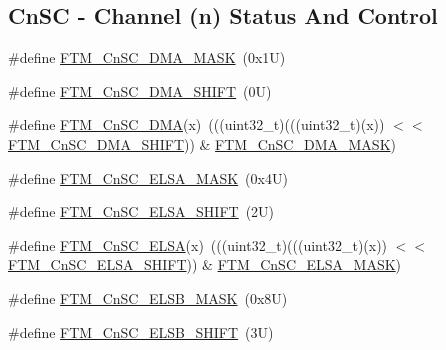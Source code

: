 \subsection*{Cn\+SC -\/ Channel (n) Status And Control}
\begin{DoxyCompactItemize}
\item 
\#define \mbox{\hyperlink{group___f_t_m___register___masks_gab38e53cd8f53bb325b849510374280f8}{F\+T\+M\+\_\+\+Cn\+S\+C\+\_\+\+D\+M\+A\+\_\+\+M\+A\+SK}}~(0x1\+U)
\item 
\#define \mbox{\hyperlink{group___f_t_m___register___masks_ga86e1227e22b8a08811a810d4f8415ef1}{F\+T\+M\+\_\+\+Cn\+S\+C\+\_\+\+D\+M\+A\+\_\+\+S\+H\+I\+FT}}~(0\+U)
\item 
\#define \mbox{\hyperlink{group___f_t_m___register___masks_ga05a6c57def867940cac9a371dd7d0e25}{F\+T\+M\+\_\+\+Cn\+S\+C\+\_\+\+D\+MA}}(x)~(((uint32\+\_\+t)(((uint32\+\_\+t)(x)) $<$$<$ \mbox{\hyperlink{group___f_t_m___register___masks_ga86e1227e22b8a08811a810d4f8415ef1}{F\+T\+M\+\_\+\+Cn\+S\+C\+\_\+\+D\+M\+A\+\_\+\+S\+H\+I\+FT}})) \& \mbox{\hyperlink{group___f_t_m___register___masks_gab38e53cd8f53bb325b849510374280f8}{F\+T\+M\+\_\+\+Cn\+S\+C\+\_\+\+D\+M\+A\+\_\+\+M\+A\+SK}})
\item 
\#define \mbox{\hyperlink{group___f_t_m___register___masks_gab5c67eddb15cb1814ba34d7d65bcee29}{F\+T\+M\+\_\+\+Cn\+S\+C\+\_\+\+E\+L\+S\+A\+\_\+\+M\+A\+SK}}~(0x4\+U)
\item 
\#define \mbox{\hyperlink{group___f_t_m___register___masks_gae5475c81aa249750da2a97ee1d1d525a}{F\+T\+M\+\_\+\+Cn\+S\+C\+\_\+\+E\+L\+S\+A\+\_\+\+S\+H\+I\+FT}}~(2\+U)
\item 
\#define \mbox{\hyperlink{group___f_t_m___register___masks_ga8c962526f103acfc261479bdd21f5bae}{F\+T\+M\+\_\+\+Cn\+S\+C\+\_\+\+E\+L\+SA}}(x)~(((uint32\+\_\+t)(((uint32\+\_\+t)(x)) $<$$<$ \mbox{\hyperlink{group___f_t_m___register___masks_gae5475c81aa249750da2a97ee1d1d525a}{F\+T\+M\+\_\+\+Cn\+S\+C\+\_\+\+E\+L\+S\+A\+\_\+\+S\+H\+I\+FT}})) \& \mbox{\hyperlink{group___f_t_m___register___masks_gab5c67eddb15cb1814ba34d7d65bcee29}{F\+T\+M\+\_\+\+Cn\+S\+C\+\_\+\+E\+L\+S\+A\+\_\+\+M\+A\+SK}})
\item 
\#define \mbox{\hyperlink{group___f_t_m___register___masks_ga7f4800478dfa63921e229a7ea4a7c067}{F\+T\+M\+\_\+\+Cn\+S\+C\+\_\+\+E\+L\+S\+B\+\_\+\+M\+A\+SK}}~(0x8\+U)
\item 
\#define \mbox{\hyperlink{group___f_t_m___register___masks_gac508e0ba6b0d6cb0cdab5ef823a640d7}{F\+T\+M\+\_\+\+Cn\+S\+C\+\_\+\+E\+L\+S\+B\+\_\+\+S\+H\+I\+FT}}~(3\+U)

\end{DoxyCompactItemize}
